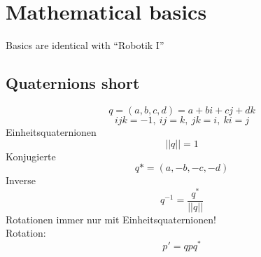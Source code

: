 

\section{Mathematical basics}%
\label{mat:sec:mathematical_basics}
Basics are identical with \enquote{Robotik I}

\subsection{Quaternions short}%
\label{mat:sub:quaternione_short}
\[ q = (a, b, c, d) = a + bi + cj + dk\]
\[ ijk = -1,\ ij = k,\ jk = i,\ ki = j\]
Einheitsquaternionen
\[ ||q|| = 1\]
Konjugierte
\[ q* = (a, -b, -c, -d)\]
Inverse
\[ q^{-1} = \frac{q^*}{||q||}\]
Rotationen immer nur mit Einheitsquaternionen!\\
Rotation:
\[ p' = qpq^*\]